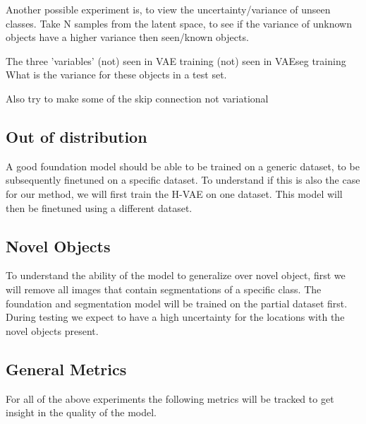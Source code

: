 Another possible experiment is, to view the uncertainty/variance of unseen classes. Take N samples from the latent space, to see if the variance of unknown objects have a higher variance then seen/known objects.

The three 'variables'
(not) seen in VAE training
(not) seen in VAEseg training
What is the variance for these objects in a test set.


Also try to make some of the skip connection not variational







\subsection*{Out of distribution}
A good foundation model should be able to be trained on a generic dataset, to be subsequently finetuned on a specific dataset. To understand if this is also the case for our method, we will first train the H-VAE on one dataset. This model will then be finetuned using a different dataset.

\subsection*{Novel Objects}
To understand the ability of the model to generalize over novel object, first we will remove all images that contain segmentations of a specific class. The foundation and segmentation model will be trained on the partial dataset first. During testing we expect to have a high uncertainty for the locations with the novel objects present.

\subsection*{General Metrics}
For all of the above experiments the following metrics will be tracked to get insight in the quality of the model.

